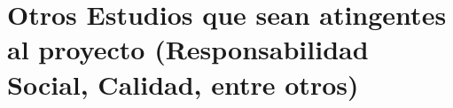 \section{Otros Estudios que sean atingentes al proyecto (Responsabilidad Social, Calidad, entre otros)}